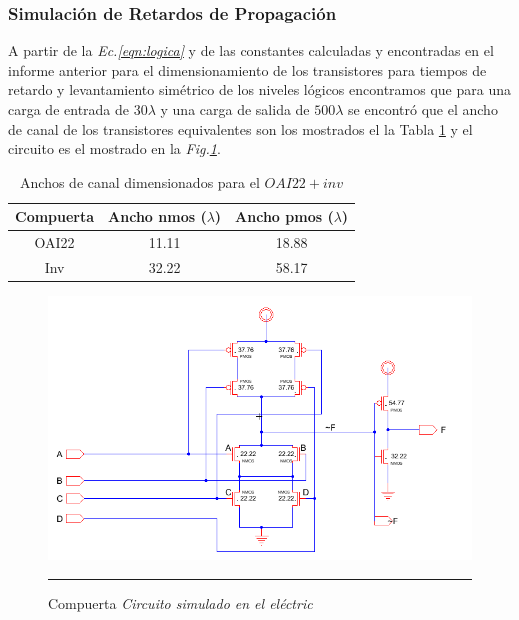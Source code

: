 \documentclass[12pt,a4paper]{article} %
\begin{document}
\subsubsection{Simulación de Retardos de Propagación}

A partir de la \textit{Ec.\ref{eqn:logica}} y de las constantes calculadas y encontradas en el informe anterior para el dimensionamiento de los transistores para tiempos de retardo y levantamiento simétrico de los niveles lógicos encontramos que para una carga de entrada de $30\lambda$ y una carga de salida de $500\lambda$ se encontró que el ancho de canal de los transistores equivalentes son los mostrados el la Tabla \ref{table:ancho_canal} y el circuito es el mostrado en la \textit{Fig.\ref{fig:circuito_E}}.\\


\begin{table}\label{table:ancho_canal}
\begin{center}
\begin{tabular}{c||c||c}
Compuerta  & Ancho nmos ($\lambda$) & Ancho pmos ($\lambda$)\\
\hline
\hline
OAI22 & 11.11 & 18.88 \\
Inv & 32.22 & 58.17 \\
\hline
\end{tabular}
\caption{Anchos de canal dimensionados para el $OAI22+inv$}
\end{center}
\end{table}

\begin{figure}[htbp]
  \centering
    \includegraphics[scale=0.5]{./Cicuito_Electric.png}
    \rule{35em}{0.5pt}
  \caption[IdealvsSim]{Compuerta \textit{Circuito simulado en el eléctric}}
  \label{fig:circuito_E}
\end{figure}
\end{document}
